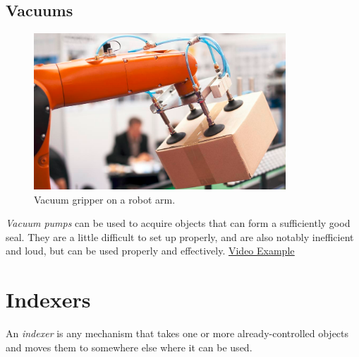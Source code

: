 \documentclass[10pt,letterpaper]{book}
\begin{document}
\subsection{Vacuums}
\begin{figure}[H]
	\includegraphics[height=2.3in]{imgs/gripper_vacuum.png}
	\caption{Vacuum gripper on a robot arm.}
\end{figure}
\textit{Vacuum pumps} can be used to acquire objects that can form a sufficiently good seal. They are a little difficult to set up properly, and are also notably inefficient and loud, but can be used properly and effectively. \href{https://www.youtube.com/watch?v=T2goz1ghXXk}{\color{red}\underline{Video Example}}

\section{Indexers}
An \textit{indexer} is any mechanism that takes one or more already-controlled objects and moves them to somewhere else where it can be used.
\end{document}
